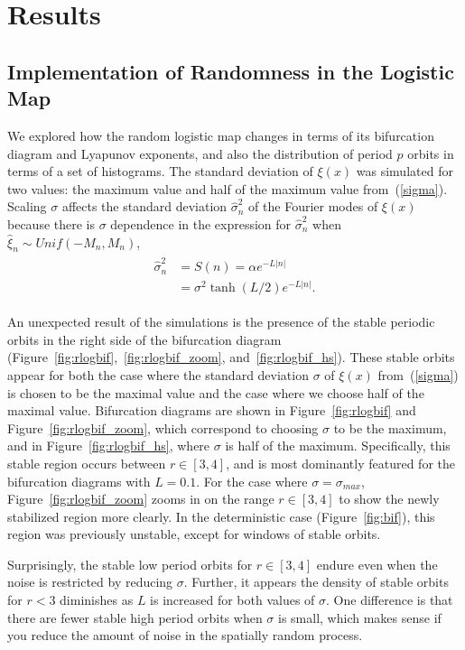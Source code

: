 \chapter{Results}\label{results}
\section{Implementation of Randomness in the Logistic Map}
We explored how the random logistic map changes in terms of its
bifurcation diagram and Lyapunov exponents, and also the distribution
of period $p$ orbits in terms of a set of histograms. The standard deviation of
$\xi(x)$ was simulated for two values: the maximum value and
half of the maximum value from~(\ref{sigma}). Scaling $\sigma$ affects
the standard deviation $\hat{\sigma}_n^2$ of the Fourier modes of $\xi(x)$
because there is $\sigma$ dependence in the expression for
$\hat{\sigma}_n^2$ when $\hat{\xi}_n \sim Unif(-M_n,M_n)$,
\begin{align*}
\begin{split}
\hat{\sigma}_n^2 &= S(n) = \alpha e^{-L|n|}\\
&= \sigma^2 \tanh(L/2) e^{-L|n|}.
\end{split}
\end{align*}

An unexpected result of the simulations is the presence of the stable
periodic orbits in the right side of the bifurcation diagram
(Figure~\ref{fig:rlogbif},~\ref{fig:rlogbif_zoom}, and~\ref{fig:rlogbif_hs}). These
stable orbits appear for both the case where the standard deviation $\sigma$ of
$\xi(x)$ from~(\ref{sigma}) is chosen to be the maximal value and the
case where we choose half of the maximal
value. Bifurcation diagrams are shown in Figure~\ref{fig:rlogbif} and
Figure~\ref{fig:rlogbif_zoom}, which correspond to choosing $\sigma$
to be the maximum, and in Figure~\ref{fig:rlogbif_hs}, where $\sigma$ is half
of the maximum. Specifically, this stable region occurs between $r\in
[3,4]$, and is most dominantly featured for the bifurcation
diagrams with $L=0.1$. For the case where $\sigma=\sigma_{max}$, Figure~\ref{fig:rlogbif_zoom} zooms in on the
range $r \in [3,4]$ to show the newly stabilized region more clearly. In the
deterministic case (Figure~\ref{fig:bif}), this region was previously
unstable, except for windows of stable orbits. 

Surprisingly, the stable low period
orbits for $r \in [3,4]$ endure even
when the noise is restricted by reducing $\sigma$. Further, it appears the density of
stable orbits for $r<3$ diminishes as $L$ is increased for both values
of $\sigma$. One difference is that there are fewer stable high period
orbits when $\sigma$ is small, which makes sense if you reduce the
amount of noise in the spatially random process. 

